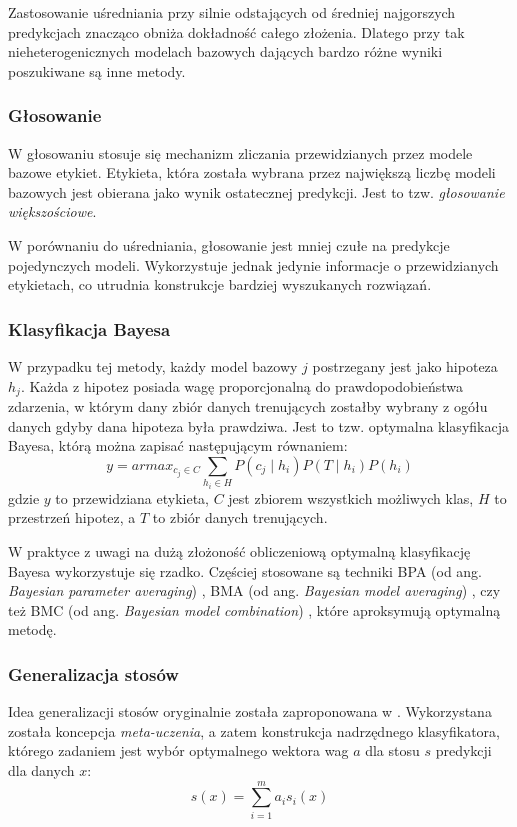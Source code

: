 Zastosowanie uśredniania przy silnie odstających od średniej najgorszych predykcjach znacząco obniża dokładność całego złożenia. Dlatego przy tak nieheterogenicznych modelach bazowych dających bardzo różne wyniki poszukiwane są inne metody.

\subsubsection{Głosowanie}

W głosowaniu stosuje się mechanizm zliczania przewidzianych przez modele bazowe etykiet. Etykieta, która została wybrana przez największą liczbę modeli bazowych jest obierana jako wynik ostatecznej predykcji. Jest to tzw. \textit{głosowanie większościowe}.

W porównaniu do uśredniania, głosowanie jest mniej czułe na predykcje pojedynczych modeli. Wykorzystuje jednak jedynie informacje o przewidzianych etykietach, co utrudnia konstrukcje bardziej wyszukanych rozwiązań.

\subsubsection{Klasyfikacja Bayesa}

W przypadku tej metody, każdy model bazowy $j$ postrzegany jest jako hipoteza $h_j$. Każda z hipotez posiada wagę proporcjonalną do prawdopodobieństwa zdarzenia, w którym dany zbiór danych trenujących zostałby wybrany z ogółu danych gdyby dana hipoteza była prawdziwa. Jest to tzw. optymalna klasyfikacja Bayesa, którą można zapisać następującym równaniem:
\begin{equation}
y = armax_{c_j \in C} \sum_{h_i \in H} P(c_j \mid h_i)P(T \mid h_i)P(h_i)
\end{equation}
gdzie $y$ to przewidziana etykieta, $C$ jest zbiorem wszystkich możliwych klas, $H$ to przestrzeń hipotez, a $T$ to zbiór danych trenujących.

W praktyce z uwagi na dużą złożoność obliczeniową optymalną klasyfikację Bayesa wykorzystuje się rzadko. Częściej stosowane są techniki BPA (od ang. \textit{Bayesian parameter averaging}) \cite{BPA}, BMA (od ang. \textit{Bayesian model averaging}) \cite{BMA}, czy też BMC (od ang. \textit{Bayesian model combination}) \cite{BMC}, które aproksymują optymalną metodę.

\subsubsection{Generalizacja stosów}
Idea generalizacji stosów oryginalnie została zaproponowana w \cite{Wolpert92stackedgeneralization}. Wykorzystana została koncepcja \textit{meta-uczenia}, a zatem konstrukcja nadrzędnego klasyfikatora, którego zadaniem jest wybór optymalnego wektora wag $a$ dla stosu $s$ predykcji dla danych $x$:
\begin{equation}
s(x) = \sum_{i=1}^{m}a_i s_i(x)
\end{equation}

